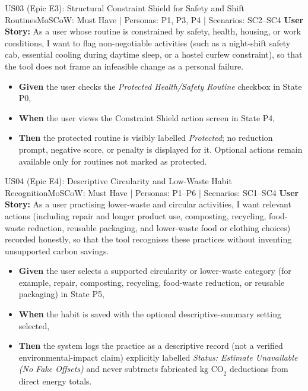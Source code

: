 \documentclass[12pt, a4paper]{article}
\begin{document}
\begin{storybox}{US03 (Epic E3): Structural Constraint Shield for Safety and Shift Routines}{MoSCoW: Must Have | Personas: P1, P3, P4 | Scenarios: SC2--SC4}
\textbf{User Story:} As a user whose routine is constrained by safety, health, housing, or work conditions, I want to flag non-negotiable activities (such as a night-shift safety cab, essential cooling during daytime sleep, or a hostel curfew constraint), so that the tool does not frame an infeasible change as a personal failure.
\begin{itemize}
    \item \textbf{Given} the user checks the \textit{Protected Health/Safety Routine} checkbox in State P0,
    \item \textbf{When} the user views the Constraint Shield action screen in State P4,
    \item \textbf{Then} the protected routine is visibly labelled \textit{Protected}; no reduction prompt, negative score, or penalty is displayed for it. Optional actions remain available only for routines not marked as protected.
\end{itemize}
\end{storybox}

\begin{storybox}{US04 (Epic E4): Descriptive Circularity and Low-Waste Habit Recognition}{MoSCoW: Must Have | Personas: P1--P6 | Scenarios: SC1--SC4}
\textbf{User Story:} As a user practising lower-waste and circular activities, I want relevant actions (including repair and longer product use, composting, recycling, food-waste reduction, reusable packaging, and lower-waste food or clothing choices) recorded honestly, so that the tool recognises these practices without inventing unsupported carbon savings.
\begin{itemize}
    \item \textbf{Given} the user selects a supported circularity or lower-waste category (for example, repair, composting, recycling, food-waste reduction, or reusable packaging) in State P5,
    \item \textbf{When} the habit is saved with the optional descriptive-summary setting selected,
    \item \textbf{Then} the system logs the practice as a descriptive record (not a verified environmental-impact claim) explicitly labelled \textit{Status: Estimate Unavailable (No Fake Offsets)} and never subtracts fabricated $\text{kg CO}_2$ deductions from direct energy totals.
\end{itemize}
\end{storybox}
\end{document}
